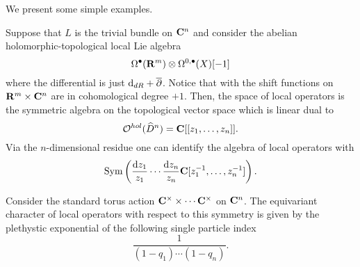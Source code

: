 \documentclass[11pt]{amsart}
\begin{document}
\parsec[s:pexp]


\parsec[s:localops]

We present some simple examples. 

\begin{eg}
Suppose that $L$ is the trivial bundle on $\mathbf{C}^n$ and consider the abelian holomorphic-topological local Lie algebra 
\[
\Omega^\bullet(\mathbf{R}^m) \otimes \Omega^{0,\bullet}(X) [-1]
\]
where the differential is just ${\rm d}_{dR} + \overline{\partial}$. 
Notice that with the shift functions on $\mathbf{R}^m \times \mathbf{C}^n$ are in cohomological degree $+1$.
Then, the space of local operators is the symmetric algebra on the topological vector space which is linear dual to 
\[
\mathcal O^{hol}(\widehat{D}^n) = \mathbf{C}[[z_1,\ldots,z_n]] .
\]
Via the $n$-dimensional residue one can identify the algebra of local operators with 
\[
\operatorname{Sym}\left(\frac{{\rm d} z_1}{z_1} \cdots \frac{{\rm d} z_n}{z_n}  \mathbf{C}[z_1^{-1}, \ldots , z_n^{-1}]\right) .
\]

Consider the standard torus action $\mathbf{C}^\times \times \cdots \mathbf{C}^\times$ on $\mathbf{C}^n$. 
The equivariant character of local operators with respect to this symmetry is given by the plethystic exponential of the following single particle index
\[
\frac{1}{(1-q_1)\cdots (1-q_n)} .
\]
\end{eg}

%
%
%
%
%
\end{document}
